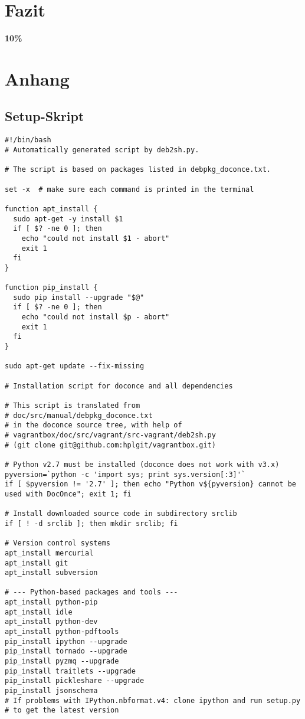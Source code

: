 \documentclass[%
oneside,                 %
final,                   %
chapterprefix=true,      %
open=right,              %
10pt]{book}
\begin{document}
\chapter{Fazit}
\textbf{10\%}
\chapter{Anhang}
\section{Setup-Skript}
\begin{verbatim}
#!/bin/bash
# Automatically generated script by deb2sh.py.

# The script is based on packages listed in debpkg_doconce.txt.

set -x  # make sure each command is printed in the terminal

function apt_install {
  sudo apt-get -y install $1
  if [ $? -ne 0 ]; then
    echo "could not install $1 - abort"
    exit 1
  fi
}

function pip_install {
  sudo pip install --upgrade "$@"
  if [ $? -ne 0 ]; then
    echo "could not install $p - abort"
    exit 1
  fi
}

sudo apt-get update --fix-missing

# Installation script for doconce and all dependencies

# This script is translated from
# doc/src/manual/debpkg_doconce.txt
# in the doconce source tree, with help of
# vagrantbox/doc/src/vagrant/src-vagrant/deb2sh.py
# (git clone git@github.com:hplgit/vagrantbox.git)

# Python v2.7 must be installed (doconce does not work with v3.x)
pyversion=`python -c 'import sys; print sys.version[:3]'`
if [ $pyversion != '2.7' ]; then echo "Python v${pyversion} cannot be used with DocOnce"; exit 1; fi

# Install downloaded source code in subdirectory srclib
if [ ! -d srclib ]; then mkdir srclib; fi

# Version control systems
apt_install mercurial
apt_install git
apt_install subversion

# --- Python-based packages and tools ---
apt_install python-pip
apt_install idle
apt_install python-dev
apt_install python-pdftools
pip_install ipython --upgrade
pip_install tornado --upgrade
pip_install pyzmq --upgrade
pip_install traitlets --upgrade
pip_install pickleshare --upgrade
pip_install jsonschema
# If problems with IPython.nbformat.v4: clone ipython and run setup.py
# to get the latest version


\end{verbatim}
\end{document}
